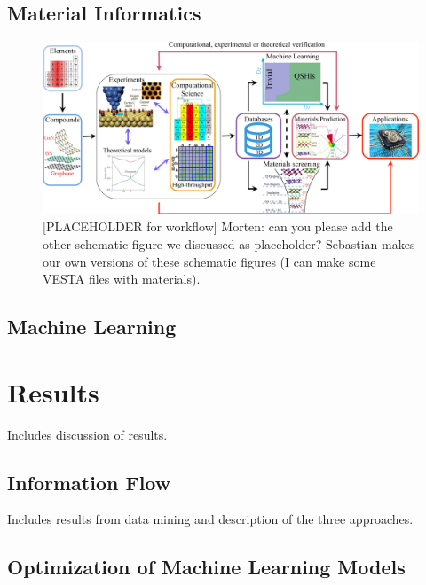 \documentclass[superscriptaddress,unsortedaddress,
 amsmath,amssymb,
 aps,
]{revtex4-2}
\begin{document}
\subsection*{Material Informatics} %

\begin{figure}[t]
    \centering
    \includegraphics[width=\textwidth]{figures/ht-workflow.jpg}
    \caption{[PLACEHOLDER for workflow] Morten: can you please add the other schematic figure we discussed as placeholder? Sebastian makes our own versions of these schematic figures (I can make some VESTA files with materials). }
    \label{fig:ht-workflow}
\end{figure}

\subsection*{Machine Learning} %

\section*{Results}
Includes discussion of results.  

\subsection*{Information Flow}  %
Includes results from data mining and description of the three approaches. 

\subsection*{Optimization of Machine Learning Models} %
\end{document}
